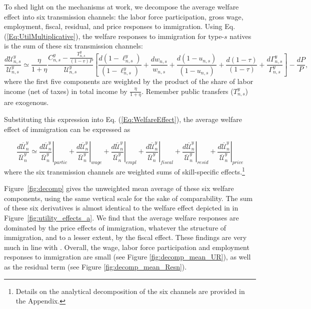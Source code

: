 \documentclass[a4paper,12pt]{article}
\begin{document}
To shed light on the mechanisms at work, we decompose the average welfare effect into six transmission channels: the labor force participation, gross wage, employment, fiscal, residual, and price responses to immigration. Using Eq. (\ref{Eq:UtilMultiplicative}), the welfare responses to immigration for type-$s$ natives is the sum of these six transmission channels:%
\begin{equation}
\frac{d\mathcal{U}_{n,s}^{y}}{\mathcal{U}_{n,s}^{y}}\simeq \frac{\eta}{1+\eta} \frac{C_{n,s}^{y}-\frac{T_{n,s}^{y}}{(1-v)P}}{\mathcal{U}_{n,s}^{y}}\left[ \frac{d(1-\ell _{n,s}^{y})}{(1-\ell _{n,s}^{y})}+\frac{dw_{n,s}}{w_{n,s}}+\frac{d(1-u_{n,s})}{(1-u_{n,s})}+\frac{d(1-\tau )}{(1-\tau )}+\frac{d\Gamma _{n,s}^{y}}{\Gamma _{n,s}^{y}}\right] -\frac{dP}{P},
\label{Eq:DecompPrivateCons}
\end{equation}
where the first five components are weighted by the product of the share of labor income (net of taxes) in total income by $\frac{\eta}{1+\eta}$. Remember public transfers ($T_{n,s}^{y}$) are exogenous.

Substituting this expression into Eq. (\ref{Eq:WelfareEffect}), the average welfare effect of immigration can be expressed as

\begin{equation}
\frac{d\overline{\mathcal{U}}_{n}^{y}}{\overline{\mathcal{U}}_{n}^{y}}\simeq \left. \frac{d\overline{\mathcal{U}}_{n}^{y}}{\overline{\mathcal{U}}_{n}^{y}}\right \vert_{partic}+\left. 
\frac{d\overline{\mathcal{U}}_{n}^{y}}{\overline{\mathcal{U}}_{n}^{y}}\right \vert_{wage}+\left. 
\frac{d\overline{\mathcal{U}}_{n}^{y}}{\overline{\mathcal{U}}_{n}^{y}}\right \vert_{empl}+\left. 
\frac{d\overline{\mathcal{U}}_{n}^{y}}{\overline{\mathcal{U}}_{n}^{y}}\right \vert_{fiscal}+\left. \frac{d\overline{\mathcal{U}}_{n}^{y}}{\overline{\mathcal{U}}_{n}^{y}}\right \vert _{resid}+\left. \frac{d\overline{\mathcal{U}}_{n}^{y}}{\overline{\mathcal{U}}_{n}^{y}}\right \vert _{price}
\label{Eq:DecompPrivateCons2}
\end{equation}
where the six transmission channels are weighted sums of skill-specific effects.\footnote{Details on the analytical decomposition of the six channels are provided in the Appendix.}

Figure~\ref{fig:decomp} gives the unweighted mean average of these six welfare components, using the same vertical scale for the sake of comparability. The sum of these six derivatives is almost identical to the welfare effect depicted in in Figure~\ref{fig:utility_effects_a}. We find that the average welfare responses are dominated by the price effects of immigration, whatever the structure of immigration, and to a lesser extent, by the fiscal effect. These findings are very much in line with \citet{Aubry2016}. Overall, the wage, labor force participation and employment responses to immigration are small (see Figure \ref{fig:decomp_mean_UR}), as well as the residual term (see Figure \ref{fig:decomp_mean_Resn}).
\end{document}

